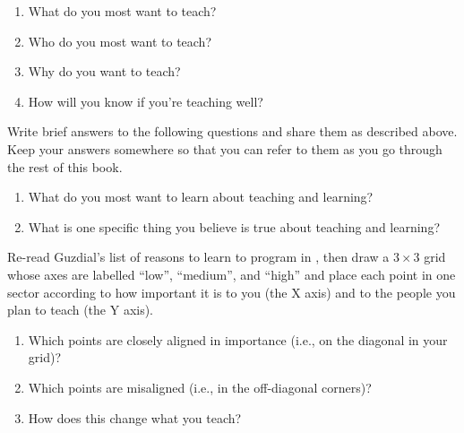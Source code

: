 \begin{enumerate}
\item
  What do you most want to teach?
\item
  Who do you most want to teach?
\item
  Why do you want to teach?
\item
  How will you know if you're teaching well?
\end{enumerate}


Write brief answers to the following questions and share them as
described above.  Keep your answers somewhere so that you can refer to
them as you go through the rest of this book.

\begin{enumerate}
\item
  What do you most want to learn about teaching and learning?
\item
  What is one specific thing you believe is true about teaching and
  learning?
\end{enumerate}


Re-read Guzdial's list of reasons to learn to program in
, then draw a $3{\times}3$ grid whose axes are
labelled ``low'', ``medium'', and ``high'' and place each point in one
sector according to how important it is to you (the X axis) and to the
people you plan to teach (the Y axis).

\begin{enumerate}

\item
  Which points are closely aligned in importance (i.e., on the diagonal
  in your grid)?

\item
  Which points are misaligned (i.e., in the off-diagonal corners)?

\item
  How does this change what you teach?

\end{enumerate}
